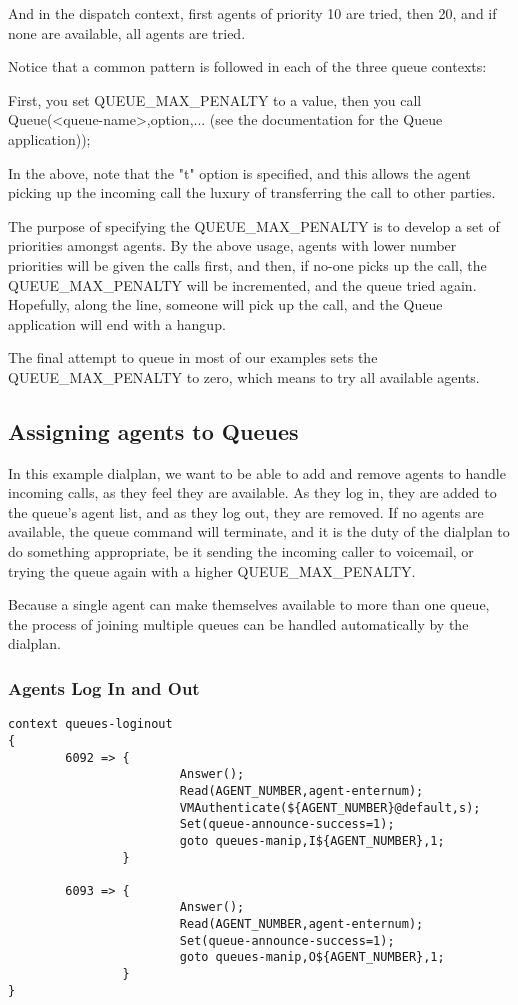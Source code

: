 And in the dispatch context, first agents of priority 10 are tried, then
20, and if none are available, all agents are tried. 

Notice that a common pattern is followed in each of the three queue contexts:

First, you set QUEUE\_MAX\_PENALTY to a value, then you call
Queue(<queue-name>,option,... (see the documentation for the Queue application));

In the above, note that the "t" option is specified, and this allows the 
agent picking up the incoming call the luxury of transferring the call to 
other parties.

The purpose of specifying the QUEUE\_MAX\_PENALTY is to develop a set of priorities
amongst agents. By the above usage, agents with lower number priorities will 
be given the calls first, and then, if no-one picks up the call, the QUEUE\_MAX\_PENALTY
will be incremented, and the queue tried again. Hopefully, along the line, someone
will pick up the call, and the Queue application will end with a hangup.

The final attempt to queue in most of our examples sets the QUEUE\_MAX\_PENALTY
to zero, which means to try all available agents.


\subsection{Assigning agents to Queues}

In this example dialplan, we want to be able to add and remove agents to 
handle incoming calls, as they feel they are available. As they log in,
they are added to the queue's agent list, and as they log out, they are
removed. If no agents are available, the queue command will terminate, and
it is the duty of the dialplan to do something appropriate, be it sending
the incoming caller to voicemail, or trying the queue again with a higher 
QUEUE\_MAX\_PENALTY.

Because a single agent can make themselves available to more than one queue,
the process of joining multiple queues can be handled automatically by the
dialplan.

\subsubsection{Agents Log In and Out}

\begin{verbatim}
context queues-loginout
{
        6092 => {
                        Answer();
                        Read(AGENT_NUMBER,agent-enternum);
                        VMAuthenticate(${AGENT_NUMBER}@default,s);
                        Set(queue-announce-success=1);
                        goto queues-manip,I${AGENT_NUMBER},1;
                }

        6093 => {
                        Answer();
                        Read(AGENT_NUMBER,agent-enternum);
                        Set(queue-announce-success=1);
                        goto queues-manip,O${AGENT_NUMBER},1;
                }
}
\end{verbatim}

